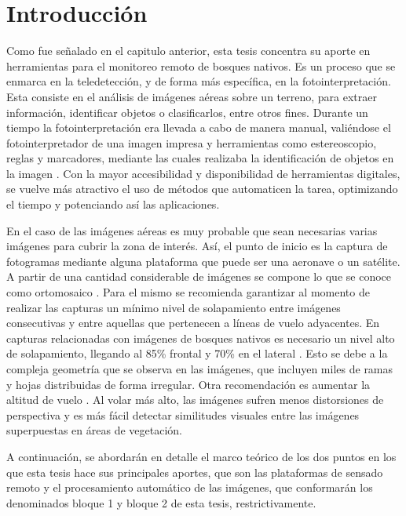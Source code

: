\section{Introducción}
Como fue señalado en el capitulo anterior, esta tesis concentra su aporte en herramientas para el monitoreo remoto de bosques nativos.
Es un proceso que se enmarca en la teledetección, y de forma más específica, en la fotointerpretación. Esta consiste en el análisis de imágenes aéreas sobre un terreno, para extraer información, identificar objetos o clasificarlos, entre otros fines. 
Durante un tiempo la fotointerpretación era llevada a cabo de manera manual, valiéndose el fotointerpretador de una imagen impresa y herramientas como estereoscopio, reglas y marcadores, mediante las cuales realizaba la identificación de objetos en la imagen \cite{noauthor_teledeteccion_nodate,hernandez_tecnologias_2011,garcia_introduccion_nodate}. Con la mayor accesibilidad y disponibilidad de herramientas digitales, se vuelve más atractivo el uso de métodos que automaticen la tarea, optimizando el tiempo y potenciando así las aplicaciones.

En el caso de las imágenes aéreas es muy probable que sean necesarias varias imágenes para cubrir la zona de interés. Así, el punto de inicio es la captura de fotogramas mediante alguna plataforma que puede ser una aeronave o un satélite. A partir de una cantidad considerable de imágenes se compone lo que se conoce como ortomosaico \cite{liba_accuracy_2015}. Para el mismo se recomienda garantizar al momento de realizar las capturas  un mínimo nivel de solapamiento entre imágenes consecutivas y entre aquellas que pertenecen a líneas de vuelo adyacentes. En capturas relacionadas con imágenes de bosques nativos es necesario un nivel alto de solapamiento, llegando al 85\% frontal y 70\% en el lateral \cite{sestari_rpas_2019,dandois_optimal_2015,seifert_influence_2019}. Esto se debe a la compleja geometría que se observa en las imágenes, que incluyen miles de ramas y hojas distribuidas de forma irregular. Otra recomendación es aumentar la altitud de vuelo \cite{bhatt_image_2022}. Al volar más alto, las imágenes sufren menos distorsiones de perspectiva y es más fácil detectar similitudes visuales entre las imágenes superpuestas en áreas de vegetación.

A continuación, se abordarán en detalle el marco teórico de los dos puntos en los que esta tesis hace sus principales aportes, que son las plataformas de sensado remoto y el procesamiento automático de las imágenes, que conformarán los denominados bloque 1 y bloque 2 de esta tesis, restrictivamente.


